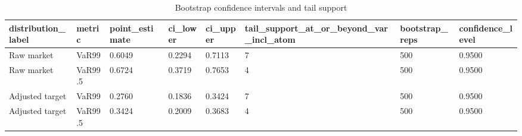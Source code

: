 \begin{table}[htbp]
\centering
\caption{Bootstrap confidence intervals and tail support}
\label{tab:v1_boot}
\begin{tabular}{llllllll}
\toprule
\textbf{distribution_label} & \textbf{metric} & \textbf{point_estimate} & \textbf{ci_lower} & \textbf{ci_upper} & \textbf{tail_support_at_or_beyond_var_incl_atom} & \textbf{bootstrap_reps} & \textbf{confidence_level} \\
\midrule
Raw market & VaR99 & 0.6049 & 0.2294 & 0.7113 & 7 & 500 & 0.9500 \\
Raw market & VaR99.5 & 0.6724 & 0.3719 & 0.7653 & 4 & 500 & 0.9500 \\
Adjusted target & VaR99 & 0.2760 & 0.1836 & 0.3424 & 7 & 500 & 0.9500 \\
Adjusted target & VaR99.5 & 0.3424 & 0.2009 & 0.3683 & 4 & 500 & 0.9500 \\
\bottomrule
\end{tabular}
\end{table}
